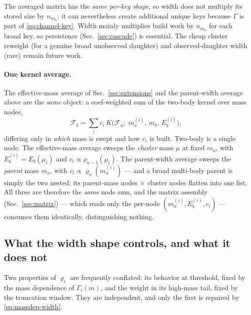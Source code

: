 \documentclass[11pt]{article}
\newcommand{\Fa}{\mathcal{F}_a}
\newcommand{\Fb}{\mathcal{F}_b}
\begin{document}
The averaged matrix has the \emph{same per-key shape}, so width does not
multiply its stored size by $n_{m_a}$; it can nevertheless create additional
unique keys because $\Gamma$ is part of \eqref{eq:channel-key}.  Width mainly
multiplies build work by $n_{m_a}$ for each broad key, so persistence
(Sec.~\ref{sec:cascade}) is essential.  The cheap cluster reweight (for a
genuine broad unobserved daughter) and observed-daughter width (rare) remain
future work.

\paragraph{One kernel average.}
The effective-mass average of Sec.~\ref{sec:extensions} and the parent-width
average above are the \emph{same} object: a coef-weighted sum of the two-body
kernel over mass nodes,
\begin{equation}
\Fb=\sum_i c_i\,K\!\big(\Fa;\;m_a^{(i)},\,m_b,\,E_b^{(i)}\big),
\label{eq:kernelaverage}
\end{equation}
differing only in \emph{which} mass is swept and how $c_i$ is built.  Two-body
is a single node.  The effective-mass average sweeps the \emph{cluster} mass
$\mu$ at fixed $m_a$, with $E_b^{(i)}=E_b(\mu_i)$ and $c_i\propto
\rho_{n-1}(\mu_i)$.  The parent-width average sweeps the \emph{parent} mass
$m_a$, with $c_i\propto\varrho_a(m_a^{(i)})$ --- and a broad multi-body parent
is simply the two nested: its parent-mass nodes $\times$ cluster nodes flatten
into one list.  All three are therefore the \emph{same} node sum, and the
matrix assembly (Sec.~\ref{sec:matrix}) --- which reads only the per-node
$(m_a^{(i)},E_b^{(i)},c_i)$ --- consumes them identically, distinguishing
nothing.

\subsection{What the width shape controls, and what it does not}
\label{sec:widthshape}

Two properties of $\varrho_i$ are frequently conflated: its behavior at
threshold, fixed by the mass dependence of $\Gamma_i(m)$, and the weight in
its high-mass tail, fixed by the truncation window.  They are independent,
and only the first is repaired by \eqref{eq:massdep-width}.
\end{document}
